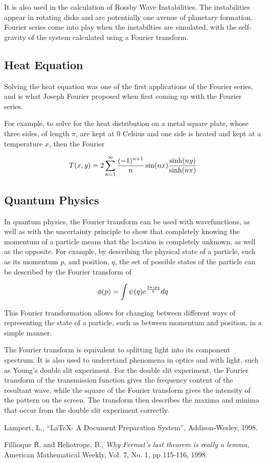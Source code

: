 \documentclass{article}
\begin{document}
It is also used in the calculation of Rossby Wave Instabilities. The instabilities appear in rotating disks and are potentially one avenue of planetary formation. Fourier series come into play when the instabilties are simulated, with the self-gravity of the system calculated using a Fourier transform.
\subsection{Heat Equation}
Solving the heat equation was one of the first applications of the Fourier series, and is what Joseph Fourier proposed when first coming up with the Fourier series.

For example, to solve for the heat distribution on a metal square plate, whose three sides, of length $\pi$, are kept at 0 Celsius and one side is heated and kept at a temperature $x$, then the Fourier 

$$T(x,y) = 2\sum_{n=1}^\infty \frac{(-1)^{n+1}}{n} \sin(nx) {\sinh(ny) \over \sinh(n\pi)}$$

\subsection{Quantum Physics}
In quantum physics, the Fourier transform can be used with wavefunctions, as well as with the uncertainty principle to show that completely knowing the momentum of a particle means that the location is completely unknown, as well as the opposite. For example, by describing the physical state of a particle, such as its momentum $p$, and position, $q$, the set of possible states of the particle can be described by the Fourier transform of 

$$\phi(p) = \int \psi (q) e^{2\pi i pq\over h} dq$$

This Fourier transformation allows for changing between different ways of representing the state of a particle, such as between momentum and position, in a simple manner. 

The Fourier transform is equivalent to splitting light into its component spectrum. It is also used to understand phenomena in optics and with light, such as Young's double slit experiment. For the double slit experiment, the Fourier transform of the transmission function gives the frequency content of the resultant wave, while the square of the Fourier transform gives the intensity of the pattern on the screen. The transform then describes the maxima and minima that occur from the double slit experiment correctly.

\begin{thebibliography}{9}
         {\sc Lamport, L.,}
         ``\LaTeX - A Document Preparation System'',
         Addison-Wesley, 1998.

         {\sc Fillioque R.} and {\sc Heliotrope, B.,}
         {\em Why Fermat's last theorem is really a lemma,}
         American Mathematical Weekly,
         Vol. 7, No. 1, pp 115-116, 1998.

\end{thebibliography}
\end{document}
